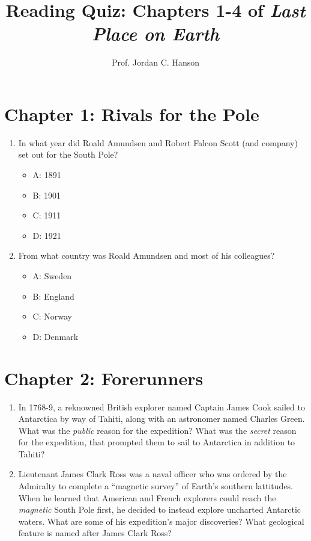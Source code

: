 \documentclass{article}
\begin{document}
\title{Reading Quiz: Chapters 1-4 of \textit{Last Place on Earth}}
\author{Prof. Jordan C. Hanson}

\maketitle

\section{Chapter 1: Rivals for the Pole}

\begin{enumerate}
\item In what year did Roald Amundsen and Robert Falcon Scott (and company) set out for the South Pole?
\begin{itemize}
\item A: 1891
\item B: 1901
\item C: 1911
\item D: 1921
\end{itemize}
\item From what country was Roald Amundsen and most of his colleagues?
\begin{itemize}
\item A: Sweden
\item B: England
\item C: Norway
\item D: Denmark
\end{itemize}
\end{enumerate}

\section{Chapter 2: Forerunners}

\begin{enumerate}
\item In 1768-9, a reknowned British explorer named Captain James Cook sailed to Antarctica by way of Tahiti, along with an astronomer named Charles Green.  What was the \textit{public} reason for the expedition?  What was the \textit{secret} reason for the expedition, that prompted them to sail to Antarctica in addition to Tahiti? \\ \vspace{3cm}
\item Lieutenant James Clark Ross was a naval officer who was ordered by the Admiralty to complete a ``magnetic survey'' of Earth's southern lattitudes.  When he learned that American and French explorers could reach the \textit{magnetic} South Pole first, he decided to instead explore uncharted Antarctic waters.  What are some of his expedition's major discoveries?  What geological feature is named after James Clark Ross?  \\ \vspace{3cm}
\end{enumerate}
\end{document}

